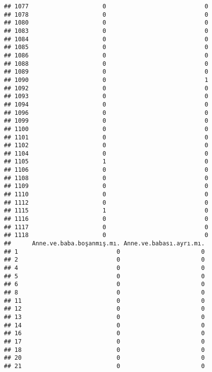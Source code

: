 \documentclass[
]{article}
\begin{document}
\begin{verbatim}
## 1077                     0                            0
## 1078                     0                            0
## 1080                     0                            0
## 1083                     0                            0
## 1084                     0                            0
## 1085                     0                            0
## 1086                     0                            0
## 1088                     0                            0
## 1089                     0                            0
## 1090                     0                            1
## 1092                     0                            0
## 1093                     0                            0
## 1094                     0                            0
## 1096                     0                            0
## 1099                     0                            0
## 1100                     0                            0
## 1101                     0                            0
## 1102                     0                            0
## 1104                     0                            0
## 1105                     1                            0
## 1106                     0                            0
## 1108                     0                            0
## 1109                     0                            0
## 1110                     0                            0
## 1112                     0                            0
## 1115                     1                            0
## 1116                     0                            0
## 1117                     0                            0
## 1118                     0                            0
##      Anne.ve.baba.boşanmış.mı. Anne.ve.babası.ayrı.mı.
## 1                            0                       0
## 2                            0                       0
## 4                            0                       0
## 5                            0                       0
## 6                            0                       0
## 8                            0                       0
## 11                           0                       0
## 12                           0                       0
## 13                           0                       0
## 14                           0                       0
## 16                           0                       0
## 17                           0                       0
## 18                           0                       0
## 20                           0                       0
## 21                           0                       0

\end{verbatim}
\end{document}
